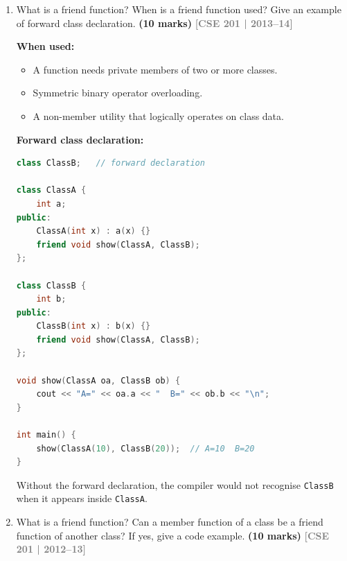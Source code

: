 \documentclass[12pt,a3paper]{article}
\newcommand{\yr}[1]{\hfill\textcolor{gray}{\small\textbf{[#1]}}}
\newcommand{\mk}[1]{\textcolor{orange!70!black}{\small\textbf{(#1 marks)}}}
\begin{document}
\begin{enumerate}
\begin{tcolorbox}[enhanced,breakable,ansbox,colback=cD!4,colframe=cD,
  boxrule=0.8pt,arc=5pt,
  title={\textbf{Answer --- Friend function definition and purpose}},
  fonttitle=\bfseries\color{white},colbacktitle=cD]
\end{tcolorbox}


\item What is a friend function? When is a friend function used? Give an example of forward class declaration. \mk{10}
\yr{CSE 201 | 2013--14}


\begin{tcolorbox}[enhanced,breakable,ansbox,colback=cD!4,colframe=cD,
  boxrule=0.8pt,arc=5pt,
  title={\textbf{Answer --- Friend function; when used; forward class declaration}},
  fonttitle=\bfseries\color{white},colbacktitle=cD]

\textbf{When used:}
\begin{itemize}[itemsep=2pt]
  \item A function needs private members of two or more classes.
  \item Symmetric binary operator overloading.
  \item A non-member utility that logically operates on class data.
\end{itemize}

\textbf{Forward class declaration:}

\begin{lstlisting}[language=C++]
class ClassB;   // forward declaration

class ClassA {
    int a;
public:
    ClassA(int x) : a(x) {}
    friend void show(ClassA, ClassB);
};

class ClassB {
    int b;
public:
    ClassB(int x) : b(x) {}
    friend void show(ClassA, ClassB);
};

void show(ClassA oa, ClassB ob) {
    cout << "A=" << oa.a << "  B=" << ob.b << "\n";
}

int main() {
    show(ClassA(10), ClassB(20));  // A=10  B=20
}
\end{lstlisting}

Without the forward declaration, the compiler would not recognise
\texttt{ClassB} when it appears inside \texttt{ClassA}.

\end{tcolorbox}

\item What is a friend function? Can a member function of a class be a friend function of another class? If yes, give a code example. \mk{10}
\yr{CSE 201 | 2012--13}


\begin{tcolorbox}[enhanced,breakable,ansbox,colback=cD!4,colframe=cD,
  boxrule=0.8pt,arc=5pt,
  title={\textbf{Answer --- Member function of one class as friend of another}},
  fonttitle=\bfseries\color{white},colbacktitle=cD]


\end{tcolorbox}
\end{enumerate}
\end{document}
